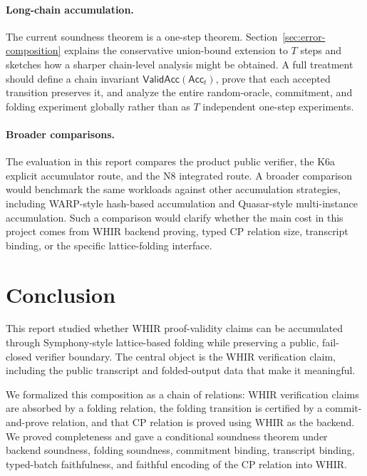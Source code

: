 \documentclass[11pt]{article}
\theoremstyle{definition}
\newcommand{\Acc}{\mathsf{Acc}}
\begin{document}
\paragraph{Long-chain accumulation.}
The current soundness theorem is a one-step theorem. Section~\ref{sec:error-composition}
explains the conservative union-bound extension to \(T\) steps and sketches how
a sharper chain-level analysis might be obtained. A full treatment should define
a chain invariant \(\mathsf{ValidAcc}(\Acc_t)\), prove that each accepted
transition preserves it, and analyze the entire random-oracle, commitment, and
folding experiment globally rather than as \(T\) independent one-step
experiments.

\paragraph{Broader comparisons.}
The evaluation in this report compares the product public verifier, the K6a
explicit accumulator route, and the N8 integrated route. A broader comparison
would benchmark the same workloads against other accumulation strategies,
including WARP-style hash-based accumulation and Quasar-style multi-instance
accumulation. Such a comparison would clarify whether the main cost in this
project comes from WHIR backend proving, typed CP relation size, transcript
binding, or the specific lattice-folding interface.

\section{Conclusion}
\label{sec:conclusion}

This report studied whether WHIR proof-validity claims can be accumulated
through Symphony-style lattice-based folding while preserving a public,
fail-closed verifier boundary. The central object is the WHIR verification
claim, including the public transcript and folded-output data that make it
meaningful.

We formalized this composition as a chain of relations: WHIR verification claims
are absorbed by a folding relation, the folding transition is certified by a
commit-and-prove relation, and that CP relation is proved using WHIR as the
backend. We proved completeness and gave a conditional soundness theorem under
backend soundness, folding soundness, commitment binding, transcript binding,
typed-batch faithfulness, and faithful encoding of the CP relation into WHIR.
\end{document}
